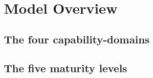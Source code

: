 \chapter{Model Overview}\label{ch:model-overview}

\section{The four capability-domains}\label{sec:the-four-capability-domains}



\section{The five maturity levels}\label{sec:the-five-maturity-levels}








